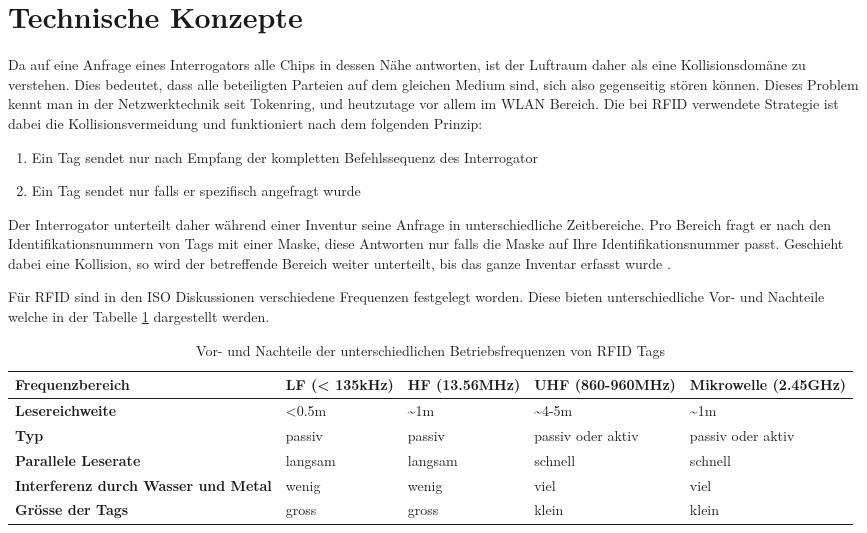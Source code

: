 \section{Technische Konzepte}

Da auf eine Anfrage eines Interrogators alle Chips in dessen Nähe antworten, ist der Luft\-raum daher als eine Kollisionsdomäne zu verstehen. Dies bedeutet, dass alle beteiligten Parteien auf dem gleichen Medium sind, sich also gegenseitig stören können. Dieses Problem kennt man in der Netzwerktechnik seit Tokenring, und heutzutage vor allem im WLAN Bereich. Die bei \gls{RFID} verwendete Strategie ist dabei die Kollisionsvermeidung und funktioniert nach dem folgenden Prinzip:
\begin{enumerate}
	\item Ein Tag sendet nur nach Empfang der kompletten Befehlssequenz des Interrogator
	\item Ein Tag sendet nur falls er spezifisch angefragt wurde
\end{enumerate}
Der Interrogator unterteilt daher während einer Inventur seine Anfrage in unterschiedliche Zeitbereiche. Pro Bereich fragt er nach den Identifikationsnummern von Tags mit einer Maske, diese Antworten nur falls die Maske auf Ihre Identifikationsnummer passt. Geschieht dabei eine Kollision, so wird der betreffende Bereich weiter unterteilt, bis das ganze Inventar erfasst wurde \parencite{ISO15693-3}.

Für \gls{RFID} sind in den ISO Diskussionen verschiedene Frequenzen festgelegt worden. Diese bieten unterschiedliche Vor- und Nachteile welche in der Tabelle \ref{tbl:RFIDFrequencies} dargestellt werden.

\begin{table}[htb]
	\begin{tabularx}{\textwidth}{|X|X|X|X|X|}
		\hline
		\textbf{Frequenz\-bereich} & \textbf{LF (< 135kHz)} & \textbf{HF (13.56MHz)} & \textbf{UHF (860-960MHz)} & \textbf{Mikrowelle (2.45GHz)}\\
		\hline
		\textbf{Lesereichweite} & <0.5m & \textasciitilde 1m & \textasciitilde 4-5m & \textasciitilde 1m\\
		\hline
		\textbf{Typ} & passiv & passiv & passiv oder aktiv & passiv oder aktiv\\
		\hline
		\textbf{Parallele Leserate} & langsam & langsam & schnell & schnell \\
		\hline
		\textbf{Interferenz durch Wasser und Metal} & wenig & wenig & viel & viel \\
		\hline
		\textbf{Grösse der Tags} & gross & gross & klein & klein \\
		\hline
	\end{tabularx}
	\caption{Vor- und Nachteile der unterschiedlichen Betriebsfrequenzen von \gls{RFID} Tags \parencite{chawla2007}}
	\label{tbl:RFIDFrequencies}
\end{table}
